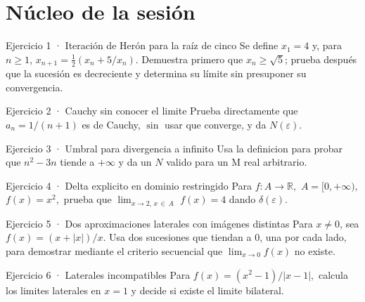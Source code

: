\documentclass[10pt,a4paper,oneside,openany]{book}
\begin{document}
\section*{Núcleo de la sesión}
\begin{PSevenExerciseFixed}{Ejercicio 1 · Iteración de Herón para la raíz de cinco}
Se define \(x_1=4\) y, para \(n\ge1\), \(x_{n+1}=\tfrac12(x_n+5/x_n)\). Demuestra primero que \(x_n\ge\sqrt5\); prueba después que la sucesión es decreciente y determina su límite sin presuponer su convergencia.
\end{PSevenExerciseFixed}
\begin{PSevenExerciseFixed}{Ejercicio 2 · Cauchy sin conocer el limite}
Prueba directamente que \(a_n=1/(n+1)\) es de Cauchy, \(\sin\) usar que converge, y da \(N(\varepsilon )\).
\end{PSevenExerciseFixed}
\begin{PSevenExerciseFixed}{Ejercicio 3 · Umbral para divergencia a infinito}
Usa la definicion para probar que \(n^{2}-3n\) tiende a \(+\infty \) y da un \(N\) valido para un M real arbitrario.
\end{PSevenExerciseFixed}
\begin{PSevenExerciseFixed}{Ejercicio 4 · Delta explicito en dominio restringido}
Para \(f:A\to \mathbb{R},\) \(A=[0,+\infty ),\) \(f(x)=x^{2},\) prueba que \(\lim_{x\to 2,\,x\,\in \,A}\) \(f(x)=4\) dando \(\delta (\varepsilon )\).
\end{PSevenExerciseFixed}
\begin{PSevenExerciseFixed}{Ejercicio 5 · Dos aproximaciones laterales con imágenes distintas}
Para \(x\ne0\), sea \(f(x)=(x+|x|)/x\). Usa dos sucesiones que tiendan a \(0\), una por cada lado, para demostrar mediante el criterio secuencial que \(\lim_{x\to0}f(x)\) no existe.
\end{PSevenExerciseFixed}
\begin{PSevenExerciseFixed}{Ejercicio 6 · Laterales incompatibles}
Para \(f(x)=(x^{2}-1)/|x-1|,\) calcula los limites laterales en \(x=1\) y decide si existe el limite bilateral.
\end{PSevenExerciseFixed}
\end{document}
